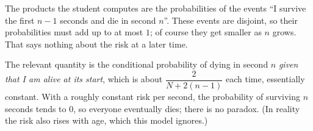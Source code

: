 The products the student computes are the probabilities of the events ``I survive the first $n-1$ seconds and die in second $n$''. These events are disjoint, so their probabilities must add up to at most $1$; of course they get smaller as $n$ grows. That says nothing about the risk at a later time.

The relevant quantity is the conditional probability of dying in second $n$ \emph{given that I am alive at its start}, which is about $\dfrac{2}{N+2(n-1)}$ each time, essentially constant. With a roughly constant risk per second, the probability of surviving $n$ seconds tends to $0$, so everyone eventually dies; there is no paradox. (In reality the risk also rises with age, which this model ignores.)
